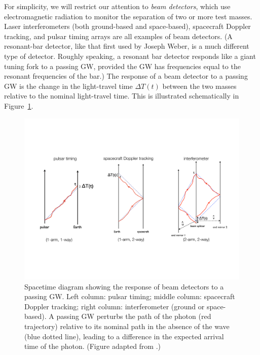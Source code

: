 For simplicity, we will restrict our attention to 
{\em beam detectors}, which use electromagnetic radiation
to monitor the separation of two or more test masses.
Laser interferometers (both ground-based and space-based),
spacecraft Doppler tracking, and pulsar timing arrays
are all examples of beam detectors.
(A resonant-bar detector, like that first used by
Joseph Weber, is a much different type of detector.
Roughly speaking, a resonant bar detector responds
like a giant tuning fork to a passing GW, provided
the GW has frequencies equal to the resonant frequencies 
of the bar.)
The response of a beam detector to a passing GW is 
the change in the light-travel time $\Delta T(t)$ 
between the two 
masses relative to the nominal light-travel time.
This is illustrated schematically in Figure~\ref{f:beam_detectors}.
%
\begin{figure}[htbp!]
\begin{center}
\includegraphics[width=\textwidth]{Figures/beam_detectors}
\caption{Spacetime diagram showing the response of beam
detectors to a passing GW.  
Left column: pulsar timing; middle column: spacecraft Doppler
tracking; right column: interferometer (ground or space-based).
A passing GW perturbs the path of the photon (red trajectory) 
relative to its nominal path in the absence of the wave 
(blue dotted line), leading to a 
difference in the expected arrival time of the photon.
(Figure adapted from \cite{Romano-Cornish:2017}.)}
\label{f:beam_detectors}
\end{center}
\end{figure}
%

